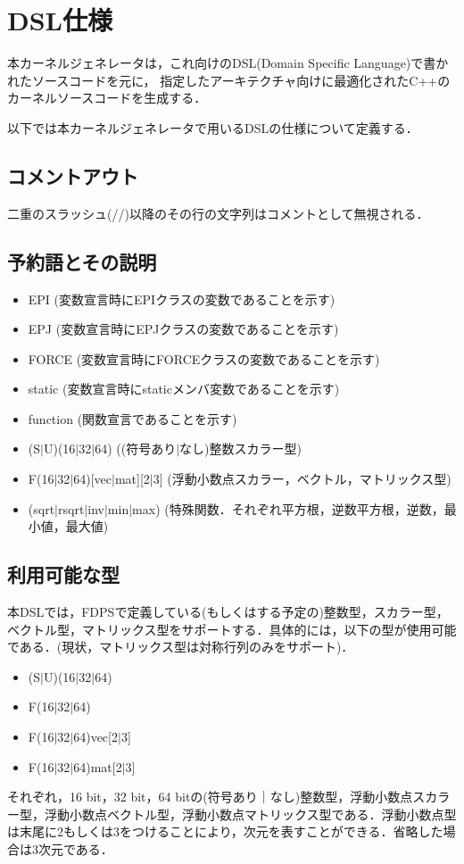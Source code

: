 \documentclass{article}
\begin{document}
\section{DSL仕様}
本カーネルジェネレータは，これ向けのDSL(Domain Specific Language)で書かれたソースコードを元に，
指定したアーキテクチャ向けに最適化されたC++のカーネルソースコードを生成する．

以下では本カーネルジェネレータで用いるDSLの仕様について定義する．

\subsection{コメントアウト}
二重のスラッシュ(//)以降のその行の文字列はコメントとして無視される．

\subsection{予約語とその説明}
 \begin{itemize}
  \item EPI (変数宣言時にEPIクラスの変数であることを示す)
  \item EPJ (変数宣言時にEPJクラスの変数であることを示す)
  \item FORCE (変数宣言時にFORCEクラスの変数であることを示す)
  \item static (変数宣言時にstaticメンバ変数であることを示す)
  \item function (関数宣言であることを示す)
  \item (S$|$U)(16$|$32$|$64) ((符号あり$|$なし)整数スカラー型)
  \item F(16$|$32$|$64)[vec$|$mat][2$|$3] (浮動小数点スカラー，ベクトル，マトリックス型)
  \item (sqrt$|$rsqrt$|$inv$|$min$|$max) (特殊関数．それぞれ平方根，逆数平方根，逆数，最小値，最大値)
 \end{itemize}

\subsection{利用可能な型}
本DSLでは，FDPSで定義している(もしくはする予定の)整数型，スカラー型，ベクトル型，マトリックス型をサポートする．具体的には，以下の型が使用可能である．(現状，マトリックス型は対称行列のみをサポート)．
 \begin{itemize}
  \item (S$|$U)(16$|$32$|$64)
  \item F(16$|$32$|$64)
  \item F(16$|$32$|$64)vec[2$|$3]
  \item F(16$|$32$|$64)mat[2$|$3]
 \end{itemize}
 それぞれ，16 bit，32 bit，64 bitの(符号あり｜なし)整数型，浮動小数点スカラー型，浮動小数点ベクトル型，浮動小数点マトリックス型である．浮動小数点型は末尾に2もしくは3をつけることにより，次元を表すことができる．省略した場合は3次元である．
\end{document}
